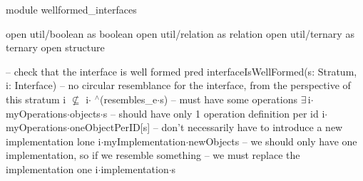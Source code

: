 module wellformed_interfaces

open util/boolean as boolean
open util/relation as relation
open util/ternary as ternary
open structure

-- check that the interface is well formed
pred interfaceIsWellFormed(s: Stratum, i: Interface)
{
  -- no circular resemblance for the interface, from the perspective of this stratum
  i $\not\subseteq$ i$\cdot$ $\!\!\!^\wedge\!$(resembles_e$\cdot$s)
  -- must have some operations
  $\exists\,$i$\cdot$myOperations$\cdot$objects$\cdot$s
  -- should have only 1 operation definition per id
  i$\cdot$myOperations$\cdot$oneObjectPerID[s]
  -- don't necessarily have to introduce a new implementation
  lone i$\cdot$myImplementation$\cdot$newObjects  
  -- we should only have one implementation, so if we resemble something
  -- we must replace the implementation
  one i$\cdot$implementation$\cdot$s
}
